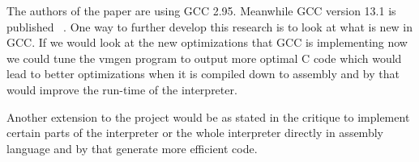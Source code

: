 \documentclass{article}
\begin{document}
The authors of the paper are using GCC 2.95. Meanwhile GCC version 13.1 is
published ~\cite{vmgen}. One way to further develop this research is to look at
what is new in GCC. If we would look at the new optimizations that GCC is
implementing now we could tune the vmgen program to output more optimal C code
which would lead to better optimizations when it is compiled down to assembly
and by that would improve the run-time of the interpreter.

Another extension to the project would be as stated in the critique to
implement certain parts of the interpreter or the whole interpreter directly in
assembly language and by that generate more efficient code. 
\clearpage


\end{document}
